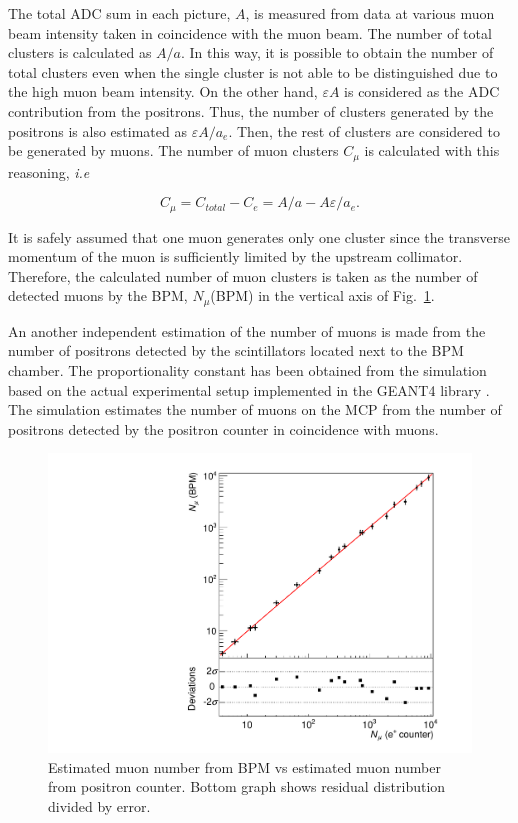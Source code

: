 \documentclass[preprint,3p,twocolumn]{elsarticle}
\begin{document}
The total ADC sum in each picture, $A$, is measured from data at various muon beam intensity taken in coincidence with the muon beam.
The number of total clusters is calculated as $A/a$. In this way, it is possible to obtain the number of total clusters even when the single cluster is not able to be distinguished due to the high muon beam intensity.
On the other hand, $\varepsilon A$ is considered as the ADC contribution from the positrons. Thus, the number of clusters generated by the positrons is also estimated as $\varepsilon A/a_e$. Then, the rest of clusters are considered to be generated by muons. The number of muon clusters $C_{\mu}$ is calculated with this reasoning, {\it i.e}
\begin{linenomath}
\begin{equation}
C_{\mu} = C_{total} - C_{e}= A/a - A\varepsilon/a_e.
\end{equation}
\end{linenomath}

It is safely assumed that one muon generates only one cluster since the transverse momentum of the muon is sufficiently limited by the upstream collimator. Therefore, the calculated number of muon clusters is taken as the number of detected muons by the BPM, $N_{\mu}$(BPM) in the vertical axis of Fig.~\ref{fig:muvsmu}.

An another independent estimation of the number of muons is made from the number of positrons detected by the scintillators located next to the BPM chamber. The proportionality constant has been obtained from the simulation based on the actual experimental setup implemented in the GEANT4 library \cite{geant4}. 
The simulation estimates the number of muons on the MCP from the number of positrons detected by the positron counter in coincidence with muons. 
\begin{figure}[tbp]
	\centering
	\includegraphics[width=\columnwidth]{figure/lin.pdf}
\caption{Estimated muon number from BPM vs estimated muon number from positron counter. 
Bottom graph shows residual distribution divided by error.}
\label{fig:muvsmu}
\end{figure}
\end{document}
